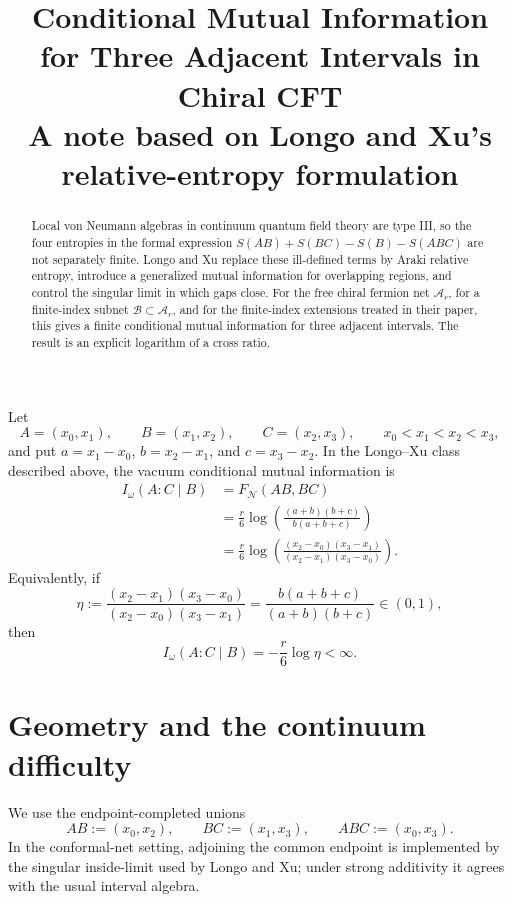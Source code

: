 \documentclass[11pt]{article}
\title{\vspace{-1.7cm}\color{navy}\bfseries
Conditional Mutual Information for Three Adjacent Intervals in Chiral CFT\\[0.35em]
\large A note based on Longo and Xu's relative-entropy formulation}
\author{}
\date{}
\theoremstyle{accenttheorem}
\theoremstyle{definition}
\newcommand{\cB}{\mathcal{B}}
\newcommand{\cN}{\mathcal{N}}
\newcommand{\Ar}{\mathcal{A}_{r}}
\newcommand{\MI}{F}
\newcommand{\CMI}{I_{\omega}}
\newcommand{\1}{\mathbf{1}}
\begin{document}
\maketitle
\vspace{-1.5em}

\begin{abstract}
Local von Neumann algebras in continuum quantum field theory are type III, so the four entropies in the formal expression
\(S(AB)+S(BC)-S(B)-S(ABC)\) are not separately finite.  Longo and Xu replace these ill-defined terms by Araki relative entropy, introduce a generalized mutual information for overlapping regions, and control the singular limit in which gaps close.  For the free chiral fermion net \(\Ar\), for a finite-index subnet \(\cB\subset\Ar\), and for the finite-index extensions treated in their paper, this gives a finite conditional mutual information for three adjacent intervals.  The result is an explicit logarithm of a cross ratio.
\end{abstract}

\begin{mainresult}
Let
\[
 A=(x_0,x_1),\qquad B=(x_1,x_2),\qquad C=(x_2,x_3),
 \qquad x_0<x_1<x_2<x_3,
\]
and put \(a=x_1-x_0\), \(b=x_2-x_1\), and \(c=x_3-x_2\).  In the Longo--Xu class described above, the vacuum conditional mutual information is
\begin{align*}
 \CMI(A:C\mid B)
 &= \MI_{\cN}(AB,BC) \\
 &= \frac{r}{6}\log\!\left(\frac{(a+b)(b+c)}{b(a+b+c)}\right) \\
 &= \frac{r}{6}\log\!\left(
     \frac{(x_2-x_0)(x_3-x_1)}{(x_2-x_1)(x_3-x_0)}
    \right).
\end{align*}
Equivalently, if
\[
 \eta:=\frac{(x_2-x_1)(x_3-x_0)}{(x_2-x_0)(x_3-x_1)}
      =\frac{b(a+b+c)}{(a+b)(b+c)}\in(0,1),
\]
then
\[
 \boxed{\ \CMI(A:C\mid B)=-\frac{r}{6}\log\eta<\infty.\ }
\]
\end{mainresult}

\section{Geometry and the continuum difficulty}

We use the endpoint-completed unions
\[
 AB:=(x_0,x_2),\qquad BC:=(x_1,x_3),\qquad ABC:=(x_0,x_3).
\]
In the conformal-net setting, adjoining the common endpoint is implemented by the singular inside-limit used by Longo and Xu; under strong additivity it agrees with the usual interval algebra.
\end{document}
